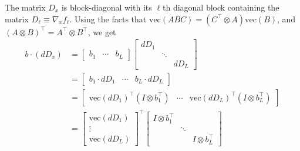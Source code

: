 \documentclass{article}
\begin{document}
The matrix $D_x$ is block-diagonal with its $\ell$th diagonal block containing
the matrix $D_\ell \equiv \nabla_x f_\ell$. Using the facts that
$\mathrm{vec}(ABC) = \left(C^\top \otimes A \right) \mathrm{vec}(B)$, and
$(A\otimes B)^\top = A^\top \otimes B^\top$, we get
\begin{align}
    b\cdot (dD_x) & =
    \begin{bmatrix}
        b_1 & \cdots & b_L
    \end{bmatrix}
    \begin{bmatrix}
        dD_1 &        &      \\
             & \ddots &      \\
             &        & dD_L
    \end{bmatrix}
    \nonumber                                                                              \\
                  & = \begin{bmatrix}
                          b_1 \cdot dD_1 & \cdots & b_L \cdot dD_L
                      \end{bmatrix}
    \nonumber                                                                              \\
                  & = \begin{bmatrix}
                          \mathrm{vec}\left(dD_1\right)^\top \left(I \otimes b_1^\top\right) &
                          \cdots                                                             &
                          \mathrm{vec}\left(dD_L\right)^\top \left(I \otimes b_L^\top\right)
                      \end{bmatrix}
    \nonumber                                                                              \\
                  & = \begin{bmatrix}
                          \mathrm{vec}\left(dD_1\right) \\
                          \vdots                        \\
                          \mathrm{vec}\left(dD_L\right)
                      \end{bmatrix}
    ^\top
    \begin{bmatrix}
        I \otimes b_1^\top &        &                    \\
                           & \ddots &                    \\
                           &        & I \otimes b_L^\top
    \end{bmatrix}
\end{align}
\end{document}

